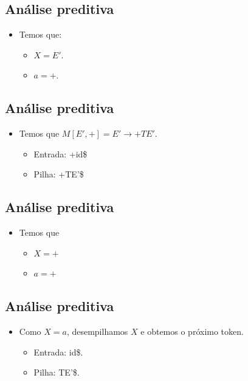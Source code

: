 \documentclass[11pt]{article}
\begin{document}
\subsection*{Análise preditiva}
\label{sec:orgef40640}

\begin{itemize}
\item Temos que:
\begin{itemize}
\item \(X = E'\).
\item \(a = +\).
\end{itemize}
\end{itemize}
\subsection*{Análise preditiva}
\label{sec:orga570187}

\begin{itemize}
\item Temos que \(M[E',+] = E'\to + TE'\).
\begin{itemize}
\item Entrada: +id\$
\item Pilha: +TE'\$
\end{itemize}
\end{itemize}
\subsection*{Análise preditiva}
\label{sec:org7c89cf4}

\begin{itemize}
\item Temos que
\begin{itemize}
\item \(X = +\)
\item \(a = +\)
\end{itemize}
\end{itemize}
\subsection*{Análise preditiva}
\label{sec:org056550e}

\begin{itemize}
\item Como \(X = a\), desempilhamos \(X\) e obtemos o próximo token.
\begin{itemize}
\item Entrada: id\$.
\item Pilha: TE'\$.
\end{itemize}
\end{itemize}
\end{document}
